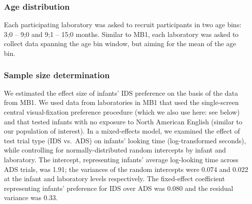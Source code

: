 \documentclass[
  ,man,floatsintext]{apa6}
\begin{document}
\hypertarget{age-distribution}{%
\subsubsection{Age distribution}\label{age-distribution}}

Each participating laboratory was asked to recruit participants in two age bins: 3;0 -- 9;0 and 9;1 -- 15;0 months. Similar to MB1, each laboratory was asked to collect data spanning the age bin window, but aiming for the mean of the age bin.

\hypertarget{sample-size-determination}{%
\subsubsection{Sample size determination}\label{sample-size-determination}}

We estimated the effect size of infants' IDS preference on the basis of the data from MB1. We used data from laboratories in MB1 that used the single-screen central visual-fixation preference procedure (which we also use here: see below) and that tested infants with no exposure to North American English (similar to our population of interest). In a mixed-effects model, we examined the effect of test trial type (IDS vs.~ADS) on infants' looking time (log-transformed seconds), while controlling for normally-distributed random intercepts by infant and laboratory. The intercept, representing infants' average log-looking time across ADS trials, was 1.91; the variances of the random intercepts were 0.074 and 0.022 at the infant and laboratory levels respectively. The fixed-effect coefficient representing infants' preference for IDS over ADS was 0.080 and the residual variance was 0.33.
\end{document}
